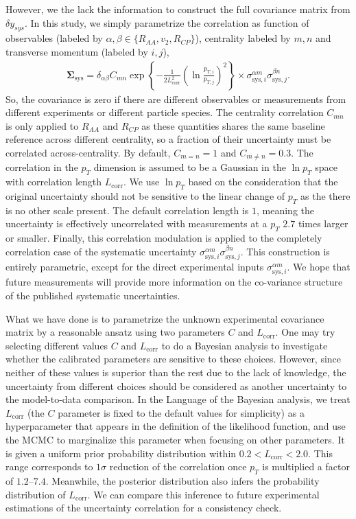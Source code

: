 However, we the lack the information to construct the full covariance matrix from $\delta y_{sys}$.
In this study, we simply parametrize the correlation as function of observables (labeled by $\alpha, \beta \in \{R_{AA}, v_2, R_{CP}\}$), centrality labeled by $m,n$ and transverse momentum (labeled by $i,j$),
\begin{eqnarray}
\mathbf{\Sigma}_{\textrm{sys}} = \delta_{\alpha\beta} C_{mn}  \exp\left\{-\frac{1}{2 L_{\textrm{corr}}^2} \left(\ln\frac{p_{T, i}}{p_{T, j}}\right)^2 \right\} \times \sigma^{\alpha m}_{\textrm{sys}, i}\sigma^{\beta n}_{\textrm{sys}, j}.
\end{eqnarray}
So, the covariance is zero if there are different observables or measurements from different experiments or different particle species.
The centrality correlation $C_{mn}$ is only applied to $R_{AA}$ and $R_{CP}$ as these quantities shares the same baseline reference across different centrality, so a fraction of their uncertainty must be correlated across-centrality. 
By default, $C_{m=n}=1$ and $C_{m\neq n}=0.3$.
The correlation in the $p_T$ dimension is assumed to be a Gaussian in the $\ln p_T$ space with correlation length $L_{\textrm{corr}}$.
We use $\ln p_T$ based on the consideration that the original uncertainty should not be sensitive to the linear change of $p_T$ as the there is no other scale present.
The default correlation length is $1$, meaning the uncertainty is effectively uncorrelated with measurements at a $p_T$ $2.7$ times larger or smaller.
Finally, this correlation modulation is applied to the completely correlation case of the systematic uncertainty $\sigma^{\alpha m}_{\textrm{sys}, i}\sigma^{\beta n}_{\textrm{sys}, j}$.
This construction is entirely parametric, except for the direct experimental inputs $\sigma^{\alpha m}_{\textrm{sys}, i}$.
We hope that future measurements will provide more information on the co-variance structure of the published systematic uncertainties.

What we have done is to parametrize the unknown experimental covariance matrix by a reasonable ansatz using two parameters $C$ and $L_{\textrm{corr}}$.
One may try selecting different values $C$ and $L_{\textrm{corr}}$ to do a Bayesian analysis to investigate whether the calibrated parameters are sensitive to these choices.
However, since neither of these values is superior than the rest due to the lack of knowledge, the uncertainty from different choices should be considered as another uncertainty to the model-to-data comparison.
In the Language of the Bayesian analysis, we treat $L_{\textrm{corr}}$ (the $C$ parameter is fixed to the default values for simplicity) as a hyperparameter that appears in the definition of the likelihood function, and use the MCMC to marginalize this parameter when focusing on other parameters.
It is given a uniform prior probability distribution within $0.2 < L_{\textrm{corr}} < 2.0$.
This range corresponds to $1\sigma$ reduction of the correlation once $p_T$ is multiplied a factor of $1.2$--$7.4$.
Meanwhile, the posterior distribution also infers the probability distribution of $L_{\textrm{corr}}$.
We can compare this inference to future experimental estimations of the uncertainty correlation for a consistency check.

